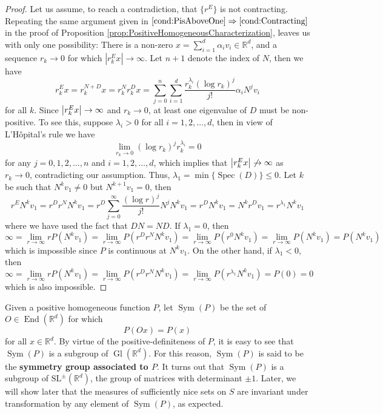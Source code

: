 \documentclass[11pt, letter]{book}
\newcommand\End{\operatorname{End}} %
\newcommand\Gl{\operatorname{Gl}} %
\newcommand\Sym{\operatorname{Sym}}
\newcommand\Spec{\operatorname{Spec}}
\newcommand{\f}[2]{\frac{#1}{#2}}
\begin{document}
\begin{proof}
Let us assume, to reach a contradiction, 
that $\{ r^E \}$ is not contracting. Repeating the same argument given in $\ref{cond:PisAboveOne}\Rightarrow\ref{cond:Contracting}$ in the proof of Proposition \ref{prop:PositiveHomogeneousCharacterization}, leaves us with only one possibility: There is a non-zero $x = \sum^d_{i=1}\alpha_i v_i \in\mathbb{R}^d$, and a sequence $r_k\to 0$ for which $|r_k^E x|\to\infty$. Let $n+1$ denote the index of $N$, then we have
\begin{equation*}
r^E_k x = r_k^{N+D} x 
= r_k^N r_k^D x 
= \sum_{j=0}^n\sum_{i=1}^d \f{r_k^{\lambda_i}(\log r_k)^j}{j!}   \alpha_iN^j v_i
\end{equation*}
for all $k$. Since $\abs{r_k^E x} \to \infty$ and $r_k \to 0$, at least one eigenvalue of $D$ must be non-positive. To see this, suppose $\lambda_i > 0$ for all $i = 1,2,\dots,d$, then in view of L'H\^{o}pital's rule we have
\begin{equation*}
    \lim_{r_k \to 0}(\log r_k)^j r_k^{\lambda_i} = 0  
\end{equation*}
for any $j =0, 1,2,\dots,n$ and $i =1,2,\dots,d$, which implies that $\abs{r^E_k x} \not\to \infty$ as $r_k \to 0$, contradicting our assumption. Thus, $\lambda_1 = \min\{ \Spec(D)\} \leq 0$. Let $k$ be such that $N^k v_1 \neq 0$ but $N^{k+1} v_1 = 0$, then
\begin{equation*}
    r^E N^k v_1 = r^D r^N N^k v_1 = r^D \sum_{j=0}^\infty \f{(\log r)^j}{j!}N^j N^k v_1 = r^D N^k v_1 = N^k r^D  v_1 =  r^{\lambda_{1}} N^k  v_1
\end{equation*}
where we have used the fact that $DN = ND$. If $\lambda_1= 0$, then 
\begin{equation*}
    \infty =  \lim_{r\to \infty} rP(N^k v_1)  = \lim_{r\to \infty} P( r^D r^N N^k v_1) =  \lim_{r\to \infty}P(r^{0} N^k v_1)= \lim_{r\to \infty}P( N^k v_1) = P(N^k v_1)
\end{equation*}
which is impossible since $P$ is continuous at $N^k v_1$. On the other hand, if $\lambda_1 < 0$, then
\begin{equation*}
    \infty = \lim_{r\to \infty} rP(N^k v_1) = \lim_{r\to \infty} P(r^D r^N N^k v_1) = \lim_{r\to \infty}P(r^{\lambda_1} N^k v_1) = P(0) = 0
\end{equation*}
which is also impossible. 
\end{proof}


\noindent Given a positive homogeneous function $P$, let $\Sym(P)$ be the set of $O\in\End(\mathbb{R}^d)$ for which
\begin{equation*}
P(Ox)=P(x)
\end{equation*}
for all $x\in\mathbb{R}^d$. By virtue of the positive-definiteness of $P$, it is easy to see that $\Sym(P)$ is a subgroup of $\Gl(\mathbb{R}^d)$. For this reason, $\Sym(P)$ is said to be the \textbf{symmetry group associated to $P$}. It turns out that $\Sym{(P)}$ is a subgroup of $\text{SL}^{\pm}(\mathbb{R}^d)$, the group of matrices with determinant $\pm 1$. Later, we will show later that the measures of sufficiently nice sets on $S$ are invariant under transformation by any element of $\Sym(P)$, as expected.  
\end{document}
